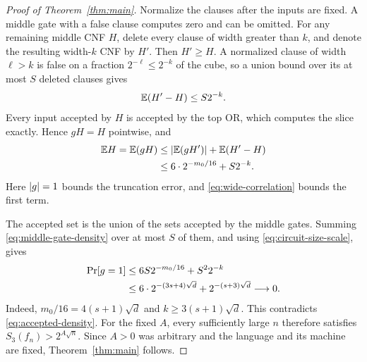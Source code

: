 \begin{proof}[Proof of Theorem~\ref{thm:main}]
Normalize the clauses after the inputs are fixed.  A middle gate with a
false clause computes zero and can be omitted.  For any remaining
middle CNF \(H\), delete every clause of width greater than \(k\),
and denote the resulting width-\(k\) CNF by \(H'\).
Then \(H'\ge H\).  A normalized clause of width \(\ell>k\)
is false on a fraction \(2^{-\ell}\le2^{-k}\) of the cube,
so a union bound over its at most \(S\) deleted clauses gives
\begin{equation}\label{eq:clause-truncation}
 \mathbb E(H'-H)\le S2^{-k}.
\end{equation}
Every input accepted by \(H\) is accepted by the top OR, which computes
the slice exactly.  Hence \(gH=H\) pointwise, and
\begin{align}
 \mathbb E H=\mathbb E(gH)
 &\le \left|\mathbb E(gH')\right|+\mathbb E(H'-H)\notag\\
 &\le 6\cdot2^{-m_0/16}+S2^{-k}.
 \label{eq:middle-gate-density}
\end{align}
Here \(\left|g\right|=1\) bounds the truncation error, and
\eqref{eq:wide-correlation} bounds the first term.

The accepted set is the union of the sets accepted by the middle gates.
Summing \eqref{eq:middle-gate-density} over at most \(S\) of them,
and using \eqref{eq:circuit-size-scale}, gives
\begin{align}
 \Pr[g=1]
 &\le6S2^{-m_0/16}+S^2 2^{-k}\notag\\
 &\le6\cdot2^{-(3s+4)\sqrt d}
           +2^{-(s+3)\sqrt d}\longrightarrow0.
 \label{eq:final-contradiction}
\end{align}
Indeed, \(m_0/16=4(s+1)\sqrt d\) and
\(k\ge3(s+1)\sqrt d\).
This contradicts \eqref{eq:accepted-density}.
For the fixed \(A\), every sufficiently large \(n\) therefore satisfies
\(S_3(f_n)>2^{A\sqrt n}\).
Since \(A>0\) was arbitrary and the language and its machine are fixed,
Theorem~\ref{thm:main} follows.
\end{proof}
